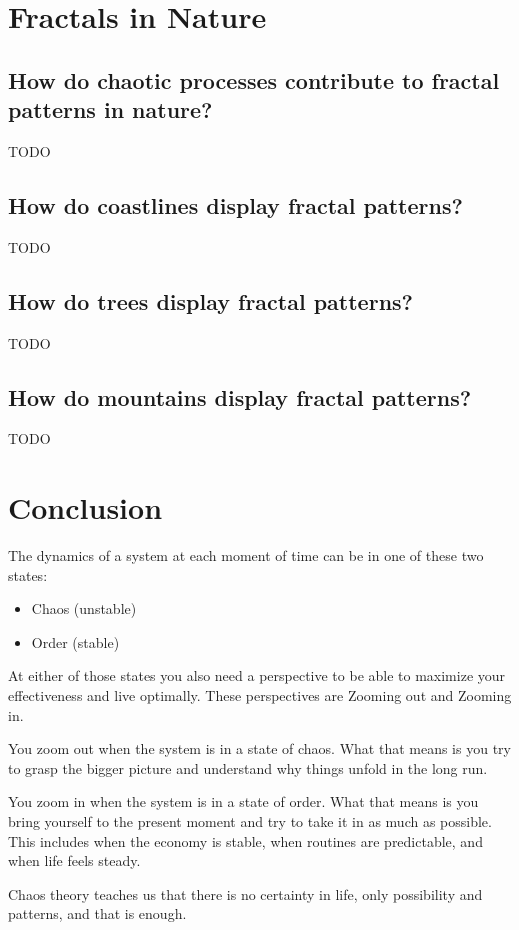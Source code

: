 \documentclass[12pt]{article}
\begin{document}
\section{Fractals in Nature}
\subsection{How do chaotic processes contribute to fractal patterns in nature?}
TODO

\subsection{How do coastlines display fractal patterns?}
TODO

\subsection{How do trees display fractal patterns?}
TODO

\subsection{How do mountains display fractal patterns?}
TODO

\section{Conclusion}

The dynamics of a system at each moment of time can be in one of these two states:
\begin{itemize}
    \item Chaos (unstable)
    \item Order (stable)
\end{itemize}


At either of those states you also need a perspective to be able to maximize your effectiveness and live optimally. These perspectives are Zooming out and Zooming in. 

You zoom out when the system is in a state of chaos. What that means is you try to grasp the bigger picture and understand why things unfold in the long run.

You zoom in when the system is in a state of order. What that means is you bring yourself to the present moment and try to take it in as much as possible. This includes when the economy is stable, when routines are predictable, and when life feels steady.

Chaos theory teaches us that there is no certainty in life, only possibility and patterns, and that is enough.


\nocite{*} 
 

\end{document}
